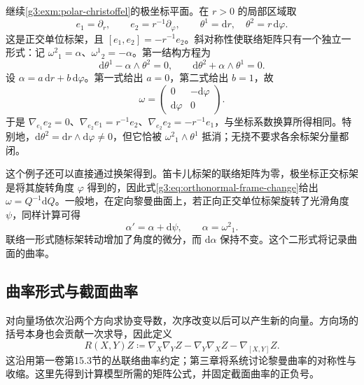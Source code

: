 \begin{example}\label{g3:exm:polar-moving-frame}
	继续\cref{g3:exm:polar-christoffel}的极坐标平面。在 \(r>0\) 的局部区域取
	\[
		e_1=\partial_r,\qquad e_2=r^{-1}\partial_\varphi,
		\qquad \theta^1=\mathrm{d}r,\quad\theta^2=r\,\mathrm{d}\varphi.
	\]
	这是正交单位标架，且 \([e_1,e_2]=-r^{-1}e_2\)。斜对称性使联络矩阵只有一个独立一形式：记 \(\omega^2{}_1=\alpha\)、\(\omega^1{}_2=-\alpha\)。第一结构方程为
	\[
		\mathrm{d}\theta^1-\alpha\wedge\theta^2=0,
		\qquad \mathrm{d}\theta^2+\alpha\wedge\theta^1=0.
	\]
	设 \(\alpha=a\,\mathrm{d}r+b\,\mathrm{d}\varphi\)。第一式给出 \(a=0\)，第二式给出 \(b=1\)，故
	\[
		\omega=
		\begin{pmatrix}0&-\mathrm{d}\varphi\\ \mathrm{d}\varphi&0\end{pmatrix}.
	\]
	于是 \(\nabla_{e_1}e_2=0\)、\(\nabla_{e_2}e_1=r^{-1}e_2\)、\(\nabla_{e_2}e_2=-r^{-1}e_1\)，与坐标系数换算所得相同。特别地，\(\mathrm{d}\theta^2=\mathrm{d}r\wedge\mathrm{d}\varphi\ne0\)，但它恰被 \(\omega^2{}_1\wedge\theta^1\) 抵消；无挠不要求各余标架分量都闭。
\end{example}

这个例子还可以直接通过换架得到。笛卡儿标架的联络矩阵为零，极坐标正交标架是将其旋转角度 \(\varphi\) 得到的，因此式\eqref{g3:eq:orthonormal-frame-change}给出 \(\omega=Q^{-1}\mathrm{d}Q\)。一般地，在定向黎曼曲面上，若正向正交单位标架旋转了光滑角度 \(\psi\)，同样计算可得
\begin{equation}\label{g3:eq:surface-connection-rotation}
	\alpha'=\alpha+\mathrm{d}\psi,
	\qquad \alpha=\omega^2{}_1.
\end{equation}
联络一形式随标架转动增加了角度的微分，而 \(\mathrm{d}\alpha\) 保持不变。这个二形式将记录曲面的曲率。

\subsection{曲率形式与截面曲率}
\label{g3:subsec:0103:03}

对向量场依次沿两个方向求协变导数，次序改变以后可以产生新的向量。方向场的括号本身也会贡献一次求导，因此定义
\begin{equation}\label{g3:eq:curvature-definition}
	R(X,Y)Z\coloneqq\nabla_X\nabla_YZ-\nabla_Y\nabla_XZ-\nabla_{[X,Y]}Z.
\end{equation}
这沿用第一卷第15.3节的丛联络曲率约定；第三章将系统讨论黎曼曲率的对称性与收缩。这里先得到计算模型所需的矩阵公式，并固定截面曲率的正负号。

